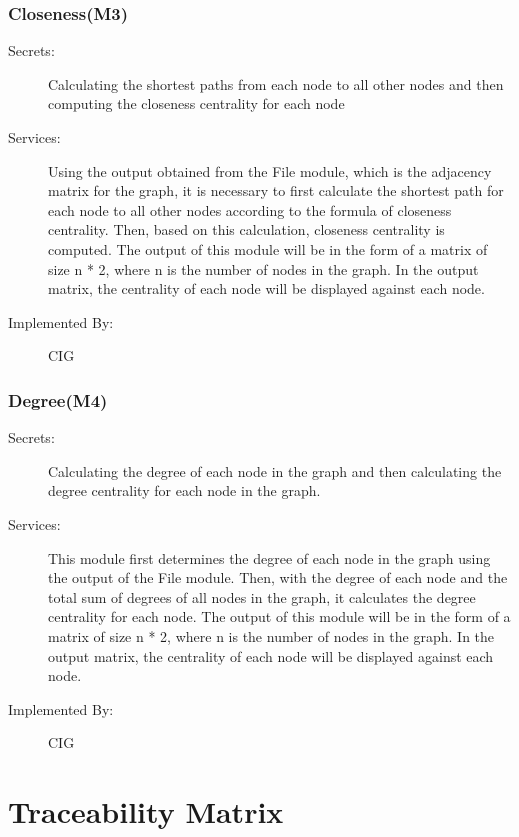 \documentclass[12pt, titlepage]{article}
\begin{document}
\subsubsection{Closeness(M3)}
\begin{description}
\item[Secrets:] Calculating the shortest paths from each node to all other nodes and then computing the closeness centrality for each node
\item[Services:] Using the output obtained from the File module, which is the adjacency matrix for the graph, it is necessary to first calculate the shortest path for each node to all other nodes according to the formula of closeness centrality. Then, based on this calculation, closeness centrality is computed. The output of this module will be in the form of a matrix of size n * 2, where n is the number of nodes in the graph. In the output matrix, the centrality of each node will be displayed against each node.
\item[Implemented By:] CIG
\end{description}

\subsubsection{Degree(M4)}
\begin{description}
\item[Secrets:] Calculating the degree of each node in the graph and then calculating the degree centrality for each node in the graph.
\item[Services:] This module first determines the degree of each node in the graph using the output of the File module. Then, with the degree of each node and the total sum of degrees of all nodes in the graph, it calculates the degree centrality for each node. The output of this module will be in the form of a matrix of size n * 2, where n is the number of nodes in the graph. In the output matrix, the centrality of each node will be displayed against each node.
\item[Implemented By:] CIG
\end{description}
\section{Traceability Matrix} \label{SecTM}
\end{document}

